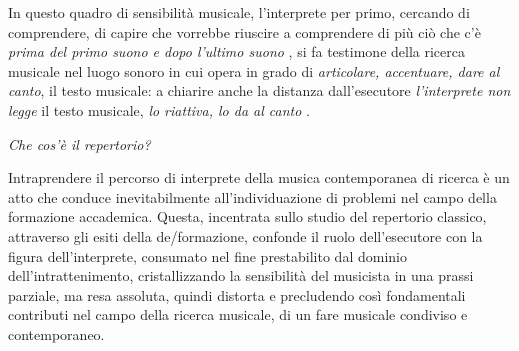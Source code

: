 \documentclass{gs-adonis}
\begin{document}
In questo quadro di sensibilità musicale, l'interprete per primo, cercando di
comprendere, di capire che vorrebbe riuscire a comprendere di più ciò che c'è
\emph{prima del primo suono e dopo l'ultimo suono} \cite{Cacciari1995}, si fa
testimone della ricerca musicale nel luogo sonoro in cui opera in grado di
\emph{articolare, accentuare, dare al canto}, il testo musicale: a chiarire
anche la distanza dall'esecutore \emph{l'interprete non legge} il testo
musicale, \emph{lo riattiva, lo da al canto} \cite{Cacciari1995}.

\emph{Che cos'è il repertorio?}

Intraprendere il percorso di interprete della musica contemporanea di ricerca è
un atto che conduce inevitabilmente all'individuazione di problemi nel campo
della formazione accademica. Questa, incentrata sullo studio del repertorio
classico, attraverso gli esiti della de/formazione, confonde il ruolo
dell'esecutore con la figura dell'interprete, consumato nel fine prestabilito
dal dominio dell'intrattenimento, cristallizzando la sensibilità del musicista
in una prassi parziale, ma resa assoluta, quindi distorta e precludendo così
fondamentali contributi nel campo della ricerca musicale, di un fare musicale
condiviso e contemporaneo.


%

%
\end{document}
